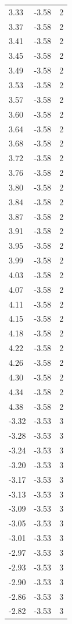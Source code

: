 \begin{longtable}{lrr}
  3.33 & -3.58 & 2 \\
  3.37 & -3.58 & 2 \\
  3.41 & -3.58 & 2 \\
  3.45 & -3.58 & 2 \\
  3.49 & -3.58 & 2 \\
  3.53 & -3.58 & 2 \\
  3.57 & -3.58 & 2 \\
  3.60 & -3.58 & 2 \\
  3.64 & -3.58 & 2 \\
  3.68 & -3.58 & 2 \\
  3.72 & -3.58 & 2 \\
  3.76 & -3.58 & 2 \\
  3.80 & -3.58 & 2 \\
  3.84 & -3.58 & 2 \\
  3.87 & -3.58 & 2 \\
  3.91 & -3.58 & 2 \\
  3.95 & -3.58 & 2 \\
  3.99 & -3.58 & 2 \\
  4.03 & -3.58 & 2 \\
  4.07 & -3.58 & 2 \\
  4.11 & -3.58 & 2 \\
  4.15 & -3.58 & 2 \\
  4.18 & -3.58 & 2 \\
  4.22 & -3.58 & 2 \\
  4.26 & -3.58 & 2 \\
  4.30 & -3.58 & 2 \\
  4.34 & -3.58 & 2 \\
  4.38 & -3.58 & 2 \\
  -3.32 & -3.53 & 3 \\
  -3.28 & -3.53 & 3 \\
  -3.24 & -3.53 & 3 \\
  -3.20 & -3.53 & 3 \\
  -3.17 & -3.53 & 3 \\
  -3.13 & -3.53 & 3 \\
  -3.09 & -3.53 & 3 \\
  -3.05 & -3.53 & 3 \\
  -3.01 & -3.53 & 3 \\
  -2.97 & -3.53 & 3 \\
  -2.93 & -3.53 & 3 \\
  -2.90 & -3.53 & 3 \\
  -2.86 & -3.53 & 3 \\
  -2.82 & -3.53 & 3 \\

\end{longtable}

